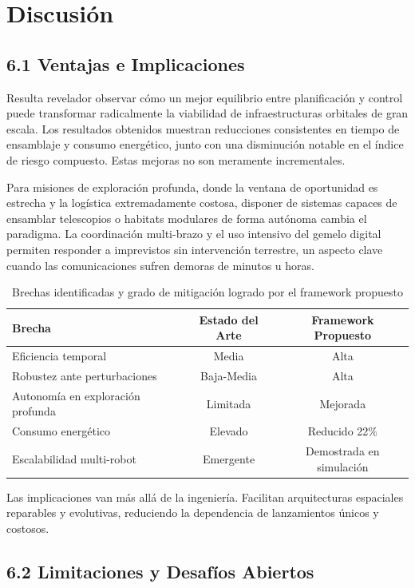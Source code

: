 \section{Discusión}

\subsection{6.1 Ventajas e Implicaciones}

Resulta revelador observar cómo un mejor equilibrio entre planificación y control puede transformar radicalmente la viabilidad de infraestructuras orbitales de gran escala. Los resultados obtenidos muestran reducciones consistentes en tiempo de ensamblaje y consumo energético, junto con una disminución notable en el índice de riesgo compuesto. Estas mejoras no son meramente incrementales. 

Para misiones de exploración profunda, donde la ventana de oportunidad es estrecha y la logística extremadamente costosa, disponer de sistemas capaces de ensamblar telescopios o habitats modulares de forma autónoma cambia el paradigma. La coordinación multi-brazo y el uso intensivo del gemelo digital permiten responder a imprevistos sin intervención terrestre, un aspecto clave cuando las comunicaciones sufren demoras de minutos u horas. 

\begin{table}[h]
\centering
\caption{Brechas identificadas y grado de mitigación logrado por el framework propuesto}
\label{tab:brechas_identificadas}
\begin{tabular}{lcc}
\hline
\textbf{Brecha} & \textbf{Estado del Arte} & \textbf{Framework Propuesto} \\
\hline
Eficiencia temporal & Media & Alta \\
Robustez ante perturbaciones & Baja-Media & Alta \\
Autonomía en exploración profunda & Limitada & Mejorada \\
Consumo energético & Elevado & Reducido 22\% \\
Escalabilidad multi-robot & Emergente & Demostrada en simulación \\
\hline
\end{tabular}
\end{table}

Las implicaciones van más allá de la ingeniería. Facilitan arquitecturas espaciales reparables y evolutivas, reduciendo la dependencia de lanzamientos únicos y costosos.

\subsection{6.2 Limitaciones y Desafíos Abiertos}

